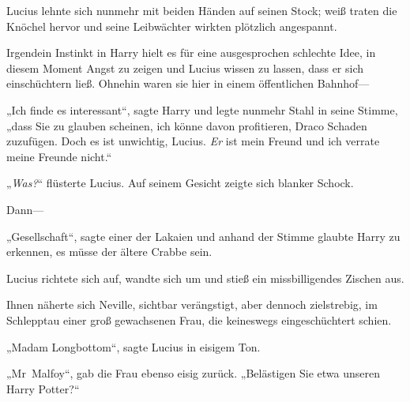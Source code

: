 Lucius lehnte sich nunmehr mit beiden Händen auf seinen Stock; weiß traten die Knöchel hervor und seine Leibwächter wirkten plötzlich angespannt.

Irgendein Instinkt in Harry hielt es für eine ausgesprochen schlechte Idee, in diesem Moment Angst zu zeigen und Lucius wissen zu lassen, dass er sich einschüchtern ließ. Ohnehin waren sie hier in einem öffentlichen Bahnhof—

„Ich finde es interessant“, sagte Harry und legte nunmehr Stahl in seine Stimme, „dass Sie zu glauben scheinen, ich könne davon profitieren, Draco Schaden zuzufügen. Doch es ist unwichtig, Lucius. \emph{Er} ist mein Freund und ich verrate meine Freunde nicht.“

„\emph{Was?}“ flüsterte Lucius. Auf seinem Gesicht zeigte sich blanker Schock.

Dann—

„Gesellschaft“, sagte einer der Lakaien und anhand der Stimme glaubte Harry zu erkennen, es müsse der ältere Crabbe sein.

Lucius richtete sich auf, wandte sich um und stieß ein missbilligendes Zischen aus.

Ihnen näherte sich Neville, sichtbar verängstigt, aber dennoch zielstrebig, im Schlepptau einer groß gewachsenen Frau, die keineswegs eingeschüchtert schien.

„Madam Longbottom“, sagte Lucius in eisigem Ton.

„Mr~Malfoy“, gab die Frau ebenso eisig zurück. „Belästigen Sie etwa unseren Harry Potter?“

